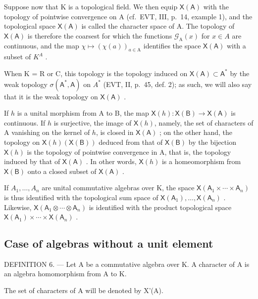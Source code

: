 Suppose now that K is a topological field. We then equip \(\mathsf{X}(\mathsf{A})\) with the topology of pointwise convergence on A (cf.~EVT, III, p.~14, example 1), and the topological space \(\mathsf{X}(\mathsf{A})\) is called the character space of A. The topology of \(\mathsf{X}(\mathsf{A})\) is therefore the coarsest for which the functions \(\mathcal{G}_{\mathrm{A}}(x)\) for \(x \in A\) are continuous, and the map \(\chi \mapsto (\chi(a))_{a \in \mathrm{A}}\) identifies the space \(\mathsf{X}(\mathsf{A})\) with a subset of \(K^{A}\) .

When K = R or C, this topology is the topology induced on \(\mathsf{X}(\mathsf{A}) \subset \mathsf{A}^{*}\) by the weak topology \(\sigma(\mathsf{A}^{*}, \mathsf{A})\) on \(A^{*}\) (EVT, II, p.~45, def. 2); as such, we will also say that it is the weak topology on \(\mathsf{X}(\mathsf{A})\) .

If \(h\) is a unital morphism from A to B, the map \(\mathsf{X}(h)\colon \mathsf{X}(\mathsf{B})\to \mathsf{X}(\mathsf{A})\) is continuous. If \(h\) is surjective, the image of \(\mathsf{X}(h)\), namely, the set of characters of A vanishing on the kernel of \(h\), is closed in \(\mathsf{X}(\mathsf{A})\) ; on the other hand, the topology on \(\mathsf{X}(h)(\mathsf{X}(\mathsf{B}))\) deduced from that of \(\mathsf{X}(\mathsf{B})\) by the bijection \(\mathsf{X}(h)\) is the topology of pointwise convergence in A, that is, the topology induced by that of \(\mathsf{X}(\mathsf{A})\) . In other words, \(\mathsf{X}(h)\) is a homeomorphism from \(\mathsf{X}(\mathsf{B})\) onto a closed subset of \(\mathsf{X}(\mathsf{A})\) .

If \(A_{1},\ldots,A_{n}\) are unital commutative algebras over K, the space \(\mathsf{X}(\mathsf{A}_{1}\times\cdots\times\mathsf{A}_{n})\) is thus identified with the topological sum space of \(\mathsf{X}(\mathsf{A}_{1}),\ldots,\mathsf{X}(\mathsf{A}_{n})\) . Likewise, \(\mathsf{X}(\mathsf{A}_{1}\otimes\cdots\otimes\mathsf{A}_{n})\) is identified with the product topological space \(\mathsf{X}(\mathsf{A}_{1})\times\cdots\times\mathsf{X}(\mathsf{A}_{n})\) .

\subsection{Case of algebras without a unit element}

DEFINITION 6. --- Let A be a commutative algebra over K. A character of A is an algebra homomorphism from A to K.

The set of characters of A will be denoted by X'(A).

